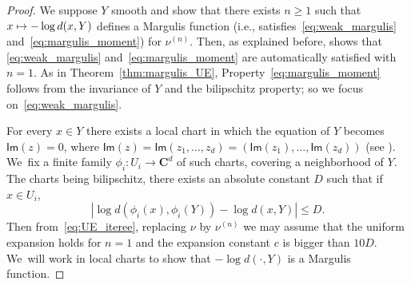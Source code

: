 \documentclass[11pt]{article}
\newcommand{\ie}{i.e.,\xspace}
\newcommand\mto{\mathchoice{\longmapsto}{\mapsto}{\mapsto}{\mapsto}}
\newcommand{\abs}[1]{\left\vert#1\right\vert}
\def\C{\mathbf{C}}
\newcommand{\Ima}{{\mathsf{Im}}}
\theoremstyle{plain}
\theoremstyle{definition}
\numberwithin{equation}{section}
\begin{document}
\begin{proof}
We suppose $Y$ smooth and show that there exists $n\geq 1$ such that
$x\mto - \log d(x, Y)$ defines a
Margulis function (\ie satisfies~\eqref{eq:weak_margulis} and~\eqref{eq:margulis_moment})
for $\nu^{(n)}$. Then, as explained before, \cite{benard-desaxce} shows that \eqref{eq:weak_margulis} and~\eqref{eq:margulis_moment} are automatically satisfied with $n=1$. As in Theorem~\ref{thm:margulis_UE}, Property~\eqref{eq:margulis_moment} follows from the invariance of $Y$ and
the bilipschitz property; so we focus on~\eqref{eq:weak_margulis}.

For every $x\in Y$ there exists a local chart in which
the equation of $Y$ becomes $\Ima (z) = 0$, where $\Ima(z) = \Ima (z_1, \ldots , z_d) =
(\Ima (z_1), \ldots , \Ima (z_d))$ (see \cite[Prop.\,1.3.8 \& 1.3.11]{BER}). We~fix
a finite family $\phi_i: U_i\to \C^d$ of such charts,
covering a neighborhood of $Y$. The charts being bilipschitz,
there exists an absolute constant $D$ such that if $x\in U_i$,
\[
\abs{\log d(\phi_i(x), \phi_i(Y)) - \log d(x,Y)}\leq D.
\] Then from~\eqref{eq:UE_iteree}, replacing
$\nu$ by $\nu^{(n)}$ we may assume that the uniform expansion holds for $n=1$ and the expansion
constant $c$ is bigger than $10D$. We~will work in local charts to show that $-\log d(\cdot, Y)$ is a Margulis function.


\end{proof}
\end{document}
